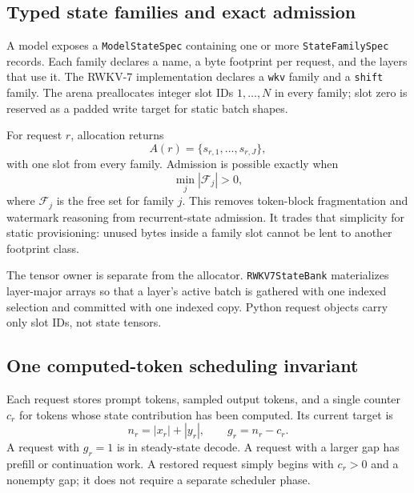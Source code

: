 \documentclass[10pt,letterpaper]{article}
\newcommand{\code}[1]{\texttt{#1}}
\begin{document}
\subsection{Typed state families and exact admission}

A model exposes a \code{ModelStateSpec} containing one or more
\code{StateFamilySpec} records.  Each family declares a name, a byte footprint
per request, and the layers that use it.  The RWKV-7 implementation declares a
\code{wkv} family and a \code{shift} family.  The arena preallocates integer
slot IDs $1,\ldots,N$ in every family; slot zero is reserved as a padded write
target for static batch shapes.

For request $r$, allocation returns
\begin{equation}
  A(r) = \{s_{r,1},\ldots,s_{r,J}\},
\end{equation}
with one slot from every family.  Admission is possible exactly when
\begin{equation}
  \min_j |\mathcal{F}_j| > 0,
  \label{eq:admission}
\end{equation}
where $\mathcal{F}_j$ is the free set for family $j$.  This removes
token-block fragmentation and watermark reasoning from recurrent-state
admission.  It trades that simplicity for static provisioning: unused bytes
inside a family slot cannot be lent to another footprint class.

The tensor owner is separate from the allocator.  \code{RWKV7StateBank}
materializes layer-major arrays so that a layer's active batch is gathered with
one indexed selection and committed with one indexed copy.  Python request
objects carry only slot IDs, not state tensors.

\subsection{One computed-token scheduling invariant}

Each request stores prompt tokens, sampled output tokens, and a single counter
$c_r$ for tokens whose state contribution has been computed.  Its current
target is
\begin{equation}
  n_r = |x_r| + |y_r|, \qquad g_r = n_r-c_r.
  \label{eq:gap}
\end{equation}
A request with $g_r=1$ is in steady-state decode.  A request with a larger gap
has prefill or continuation work.  A restored request simply begins with
$c_r>0$ and a nonempty gap; it does not require a separate scheduler phase.
\end{document}
